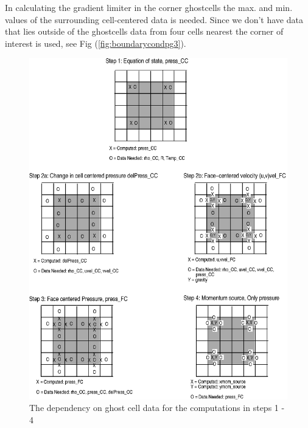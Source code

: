 \documentclass[fleqn]{article}
\begin{document}
{In calculating the gradient limiter in the corner ghostcells the max. and
min. values of the surrounding cell-centered data is needed.  Since we don't
have data that lies outside of the ghostcells data from four cells nearest
the corner of interest is used, see Fig (\ref{fig:boundarycondpg3}).
%
%
\begin{figure}
    \center
    \includegraphics{boundarycond_pg1.eps}
    \caption{The dependency on ghost cell data for the computations in steps 1 - 4}
    \label{fig:boundarycondpg1}
\end{figure}
%
%
\begin{figure}
    \center

\end{figure}}
\end{document}
